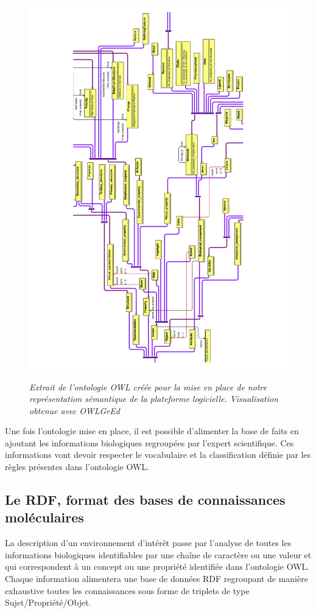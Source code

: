 \begin{figure}
  \centering
  {\includegraphics[width=0.8\linewidth]{./figures/ch5/ontology}}
    \caption[Extrait de notre l'ontologie OWL.]{\it Extrait de l'ontologie OWL créée pour la mise en place de notre représentation sémantique de la plateforme logicielle. Visualisation obtenue avec OWLGrEd \cite{barzdins2010owlgred}}
  \label{Fig:ontology}
  \hspace{0.3cm}
\end{figure}

Une fois l'ontologie mise en place, il est possible d'alimenter la base de faits en ajoutant les informations biologiques regroupées par l'expert scientifique. Ces informations vont devoir respecter le vocabulaire et la classification définie par les règles présentes dans l'ontologie OWL.

\subsection{Le RDF, format des bases de connaissances moléculaires} \label{rdf_import}

La description d'un environnement d'intérêt passe par l'analyse de toutes les informations biologiques identifiables par une chaîne de caractère ou une valeur et qui correspondent à un concept ou une propriété identifiée dans l'ontologie OWL. Chaque information alimentera une base de données RDF regroupant de manière exhaustive toutes les connaissances sous forme de triplets de type Sujet/Propriété/Objet.

